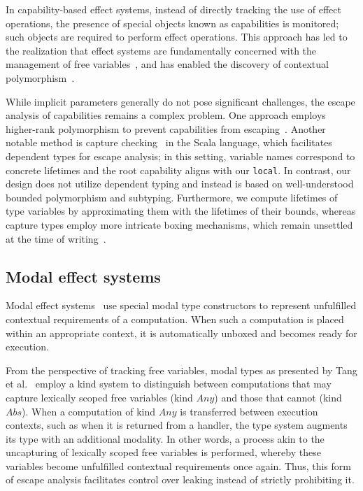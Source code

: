 \documentclass[acmsmall,review,screen]{acmart}
\begin{document}
In capability-based effect systems, instead of directly tracking the use of effect operations, the presence of special objects known as capabilities is monitored; such objects are required to perform effect operations.
This approach has led to the realization that effect systems are fundamentally concerned with the management of free variables~\cite{odersky2022scoped}, and has enabled the discovery of contextual polymorphism~\cite{brachthauser2020effects, brachthauser2022effects}.

While implicit parameters generally do not pose significant challenges, the escape analysis of capabilities remains a complex problem.
One approach employs higher-rank polymorphism to prevent capabilities from escaping~\cite{launchbury1995state, xie2022first}.
Another notable method is capture checking~\cite{boruch2023capturing} in the Scala language, which facilitates dependent types for escape analysis; in this setting, variable names correspond to concrete lifetimes and the root capability aligns with our \lstinline[language=colang]{local}.
In contrast, our design does not utilize dependent typing and instead is based on well-understood bounded polymorphism and subtyping.
Furthermore, we compute lifetimes of type variables by approximating them with the lifetimes of their bounds, whereas capture types employ more intricate boxing mechanisms, which remain unsettled at the time of writing~\cite{xu2023formalizing, whatsinthebox}.

\subsection{Modal effect systems} \label{subsec:overview-modal}

Modal effect systems~\cite{zyuzin2021contextual, tang2025modal} use special modal type constructors to represent unfulfilled contextual requirements of a computation.
When such a computation is placed within an appropriate context, it is automatically unboxed and becomes ready for execution.

From the perspective of tracking free variables, modal types as presented by Tang et al.~\cite{tang2025modal} employ a kind system to distinguish between computations that may capture lexically scoped free variables (kind $Any$) and those that cannot (kind $Abs$).
When a computation of kind $Any$ is transferred between execution contexts, such as when it is returned from a handler, the type system augments its type with an additional modality.
In other words, a process akin to the uncapturing of lexically scoped free variables is performed, whereby these variables become unfulfilled contextual requirements once again.
Thus, this form of escape analysis facilitates control over leaking instead of strictly prohibiting it.
\end{document}
